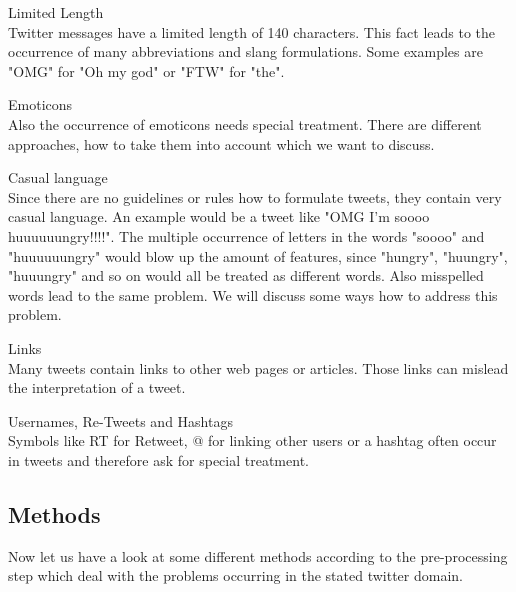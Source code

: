 \documentclass{sig-alternate}
\begin{document}
\begin{itemize}
\begin{item}
Limited Length\\
Twitter messages have a limited length of 140 characters. This fact leads to the occurrence of many abbreviations and slang formulations. Some examples are "OMG" for "Oh my god" or "FTW" for "the".
\end{item}


\begin{item}
Emoticons\\
Also the occurrence of emoticons needs special treatment. There are different approaches, how to take them into account which we want to discuss.
\end{item}

\begin{item}
Casual language\\
Since there are no guidelines or rules how to formulate tweets, they contain very casual language. An example would be a tweet like "OMG I'm soooo huuuuuungry!!!!". The multiple occurrence of letters in the words "soooo" and "huuuuuungry" would blow up the amount of features, since "hungry", "huungry", "huuungry" and so on would all be treated as different words. Also misspelled words lead to the same problem. We will discuss some ways how to address this problem.
\end{item}

\begin{item}
Links\\
Many tweets contain links to other web pages or articles. Those links can mislead the interpretation of a tweet.
\end{item}

\begin{item}
Usernames, Re-Tweets and Hashtags\\
Symbols like RT for Retweet, @ for linking other users or a hashtag often occur in tweets and therefore ask for special treatment.
\end{item}
\end{itemize}

\subsection{Methods}
Now let us have a look at some different methods according to the pre-processing step which deal with the problems occurring in the stated twitter domain.
\end{document}
